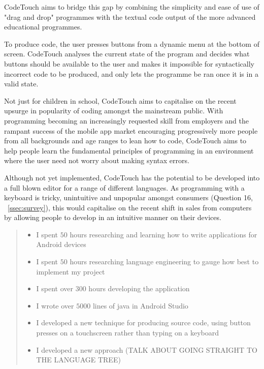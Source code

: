 \documentclass[ %
                    author={Jonathan Rankin},
                supervisor={Dr. David May, Dr. Ian Holyer},
                    degree={MEng},
                     title={CodeTouch},
                  subtitle={A Revolutionary Way To Program Real Code On Touch Screen Devices},
                      type={enterprise},
                      year={2015 } ]{dissertation}
\begin{document}
CodeTouch aims to bridge this gap by combining the simplicity and ease of use of "drag and drop" programmes with the textual code output of the more advanced educational programmes. 


To produce code, the user presses buttons from a dynamic menu at the bottom of screen. CodeTouch analyses the current state of the program and decides what buttons should be available to the user and makes it impossible for syntactically incorrect code to be produced, and only lets the programme be ran once it is in a valid state.

Not just for children in school, CodeTouch aims to capitalise on the recent upsurge in popularity of coding amongst the mainstream public. With programming becoming an increasingly requested skill from employers and the rampant success of the mobile app market encouraging progressively more people from all backgrounds and age ranges to lean how to code, CodeTouch aims to help people learn the fundamental principles of programming in an environment where the user need not worry about making syntax errors. 

Although not yet implemented, CodeTouch has the potential to be developed into a full blown editor for a range of different languages. As programming with a keyboard is tricky, unintuitive and unpopular amongst consumers (Question 16, ~\ref{ssec:survey}), this would capitalise on the recent shift in sales from computers by allowing people to develop in an intuitive manner on their devices.



\begin{quote}
\noindent
\begin{itemize}
\item I spent $50$ hours researching and learning how to write applications for Android devices
\item I spent $50$ hours researching language engineering to gauge how best to implement my project
\item I spent over $300$ hours developing the application
\item I wrote over $5000$ lines of java in Android Studio
\item I developed a new technique for producing source code, using button presses on a touchscreen rather than typing on a keyboard 
\item I developed a new approach (TALK ABOUT GOING STRAIGHT TO THE LANGUAGE TREE)

\end{itemize}
\end{quote}
\end{document}
